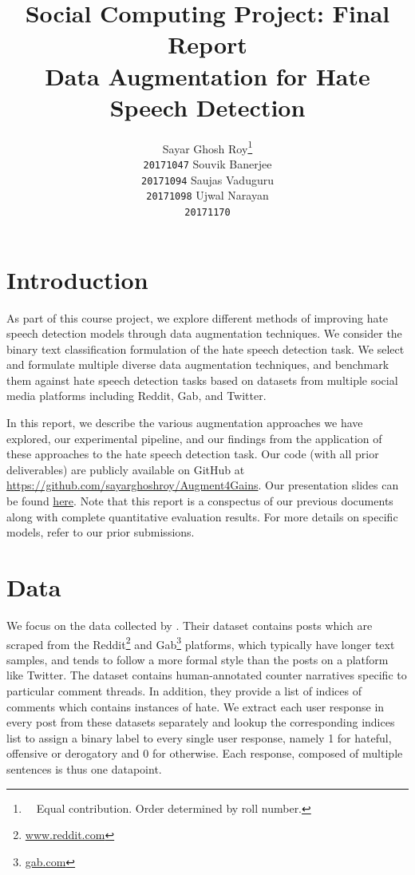 \documentclass[11pt,a4paper]{article}
\title{{\normalsize Social Computing Project: Final Report} \vspace{0.18cm} \\ Data Augmentation for Hate Speech Detection}
\author{Sayar Ghosh Roy\thanks{\ \ Equal contribution. Order determined by roll number.} \\ \texttt{20171047} \And
        Souvik Banerjee\footnotemark[1] \\ \texttt{20171094} \And
        Saujas Vaduguru\footnotemark[1] \\ \texttt{20171098} \And
        Ujwal Narayan\footnotemark[1] \\ \texttt{20171170}}
\date{}
\newcommand\Warning{%
 \makebox[1.4em][c]{%
 \makebox[0pt][c]{\raisebox{.1em}{\small!}}%
 \makebox[0pt][c]{\Large$\bigtriangleup$}}}%
\begin{document}
\maketitle



\section{Introduction}
As part of this course project, we explore different methods of improving hate speech detection models through data augmentation techniques. We consider the binary text classification formulation of the hate speech detection task. We select and formulate multiple diverse data augmentation techniques, and benchmark them against hate speech detection tasks based on datasets from multiple social media platforms including Reddit, Gab, and Twitter.

In this report, we describe the various augmentation approaches we have explored, our experimental pipeline, and our findings from the application of these approaches to the hate speech detection task. Our code (with all prior deliverables) are publicly available on GitHub at \url{https://github.com/sayarghoshroy/Augment4Gains}. Our presentation slides can be found \href{https://docs.google.com/presentation/d/1q8dZB-yR3A5ii-VkN5-RcjfE70lDnGSTHhFFtJ31EEM/edit?usp=sharing}{here}. Note that this report is a conspectus of our previous documents along with complete quantitative evaluation results. For more details on specific models, refer to our prior submissions.

\section{Data}
We focus on the data collected by \citet{benchmark}. Their dataset contains posts which are scraped from the Reddit\footnote{\url{www.reddit.com}} and Gab\footnote{\url{gab.com}} platforms, which typically have longer text samples, and tends to follow a more formal style than the posts on a platform like Twitter. The dataset contains human-annotated counter narratives specific to particular comment threads. In addition, they provide a list of indices of comments which contains instances of hate. We extract each user response in every post from these datasets separately and lookup the corresponding indices list to assign a binary label to every single user response, namely 1 for hateful, offensive or derogatory and 0 for otherwise. Each response, composed of multiple sentences is thus one datapoint.
\end{document}
